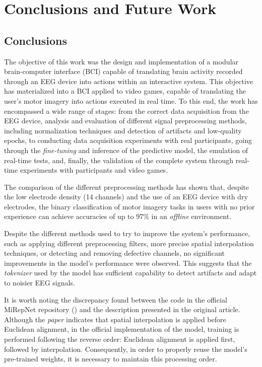 \chapter*{Conclusions and Future Work}
\label{cap:conclusionsAndFutureWork}

\section*{Conclusions}
\label{sec:conclusiones}

The objective of this work was the design and implementation of a modular brain-computer interface (BCI) capable of translating brain activity recorded through an EEG device into actions within an interactive system. This objective has materialized into a BCI applied to video games, capable of translating the user's motor imagery into actions executed in real time. To this end, the work has encompassed a wide range of stages: from the correct data acquisition from the EEG device, analysis and evaluation of different signal preprocessing methods, including normalization techniques and detection of artifacts and low-quality epochs, to conducting data acquisition experiments with real participants, going through the \textit{fine-tuning} and inference of the predictive model, the emulation of real-time tests, and, finally, the validation of the complete system through real-time experiments with participants and video games.

The comparison of the different preprocessing methods has shown that, despite the low electrode density (14 channels) and the use of an EEG device with dry electrodes, the binary classification of motor imagery tasks in users with no prior experience can achieve accuracies of up to 97\% in an \textit{offline} environment.

Despite the different methods used to try to improve the system's performance, such as applying different preprocessing filters, more precise spatial interpolation techniques, or detecting and removing defective channels, no significant improvements in the model's performance were observed. This suggests that the \textit{tokenizer} used by the model has sufficient capability to detect artifacts and adapt to noisier EEG signals.

It is worth noting the discrepancy found between the code in the official MiRepNet repository (\cite{liu2025mirepnetpipelinefoundationmodel}) and the description presented in the original article. Although the \textit{paper} indicates that spatial interpolation is applied before Euclidean alignment, in the official implementation of the model, training is performed following the reverse order: Euclidean alignment is applied first, followed by interpolation. Consequently, in order to properly reuse the model's pre-trained weights, it is necessary to maintain this processing order.

